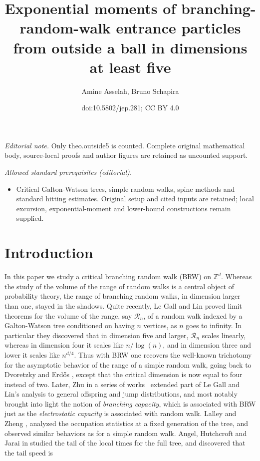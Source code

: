 \documentclass[11pt]{article}
\title{Exponential moments of branching-random-walk entrance particles from outside a ball in dimensions at least five}
\author{Amine Asselah, Bruno Schapira}
\date{doi:10.5802/jep.281; CC BY 4.0}
\numberwithin{equation}{section}
\theoremstyle{plain}
\theoremstyle{definition}
\newcommand\Z{\mathbb{Z}}
\newcommand{\1}{{\text{\Large $\mathfrak 1$}}}
\begin{document}
\maketitle
\noindent\textit{Editorial note.} Only theo.outside5 is counted. Complete original mathematical body, source-local proofs and author figures are retained as uncounted support.\par\medskip
\noindent\textit{Allowed standard prerequisites (editorial).}\begin{itemize}
\item Critical Galton-Watson trees, simple random walks, spine methods and standard hitting estimates. Original setup and cited inputs are retained; local excursion, exponential-moment and lower-bound constructions remain supplied.
\end{itemize}\medskip
\section{Introduction}\label{sec-intro}
In this paper we study a critical branching random walk (BRW) on $\Z^d$.
Whereas the study of the volume of the range of random walks is a central
object of probability theory, the range of branching random walks,
in dimension larger than one, stayed in the shadows.
Quite recently, Le Gall and Lin \cite{LGL1,LGL2} proved limit theorems
for the volume of the range, say $\mathcal R_n$, of a random walk indexed by a Galton-Watson tree
conditioned on having $n$ vertices, as $n$ goes
to infinity.
In particular they discovered that in dimension five and larger,
$\mathcal R_n$
scales linearly, whereas in dimension four it scales like
$n/\log(n)$, and in dimension three and lower it scales
like $n^{d/4}$. Thus with BRW one recovers the well-known trichotomy for the asymptotic behavior of the range
of a simple random walk, going back to Dvoretzky and Erd\H{o}s \cite{DE}, except that
the critical dimension is now equal to four instead of two.
Later, Zhu in a series of works~\cite{Zhu1,Zhu2,Zhu4,Zhu3} extended part of Le Gall and Lin's analysis to general offspring and jump distributions,
and most notably brought into light
the notion of {\it branching capacity}, which is associated with
BRW just as the {\it electrostatic capacity}
is associated with random walk.
Lalley and Zheng \cite{LZ11},
analyzed the occupation statistics at a fixed generation of the tree,
and observed similar behaviors as for a simple random walk.
Angel, Hutchcroft and Jarai in \cite{AHJ}
studied the tail of the local times for the full tree, and
discovered that the tail speed is
\end{document}
